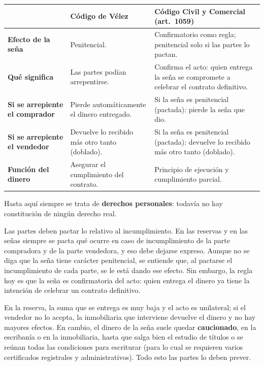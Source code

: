 \documentclass[12pt,oneside]{book}
\begin{document}
\begin{table}[H]
\centering
\small
\begin{tabularx}{\textwidth}{@{}>{\raggedright\arraybackslash}p{}>{\raggedright\arraybackslash}X>{\raggedright\arraybackslash}X@{}}
\toprule
 & \textbf{Código de Vélez} & \textbf{Código Civil y Comercial (art.~1059)} \\
\midrule
\textbf{Efecto de la seña} & Penitencial. & Confirmatorio como regla; penitencial solo si las partes lo pactan. \\
\textbf{Qué significa} & Las partes podían arrepentirse. & Confirma el acto: quien entrega la seña se compromete a celebrar el contrato definitivo. \\
\textbf{Si se arrepiente el comprador} & Pierde automáticamente el dinero entregado. & Si la seña es penitencial (pactada): pierde la seña que dio. \\
\textbf{Si se arrepiente el vendedor} & Devuelve lo recibido más otro tanto (doblado). & Si la seña es penitencial (pactada): devuelve lo recibido más otro tanto (doblado). \\
\textbf{Función del dinero} & Asegurar el cumplimiento del contrato. & Principio de ejecución y cumplimiento parcial. \\
\bottomrule
\end{tabularx}
\end{table}

Hasta aquí siempre se trata de \textbf{derechos personales}: todavía no hay constitución de ningún derecho real.

Las partes deben pactar lo relativo al incumplimiento. En las reservas y en las señas siempre se pacta qué ocurre en caso de incumplimiento de la parte compradora y de la parte vendedora, y eso debe dejarse expreso. Aunque no se diga que la seña tiene carácter penitencial, se entiende que, al pactarse el incumplimiento de cada parte, se le está dando ese efecto. Sin embargo, la regla hoy es que la seña es confirmatoria del acto: quien entrega el dinero ya tiene la intención de celebrar un contrato definitivo.

En la reserva, la suma que se entrega es muy baja y el acto es unilateral; si el vendedor no lo acepta, la inmobiliaria que interviene devuelve el dinero y no hay mayores efectos. En cambio, el dinero de la seña suele quedar \textbf{caucionado}, en la escribanía o en la inmobiliaria, hasta que salga bien el estudio de títulos o se reúnan todas las condiciones para escriturar (para lo cual se requieren varios certificados registrales y administrativos). Todo esto las partes lo deben prever.
\end{document}
